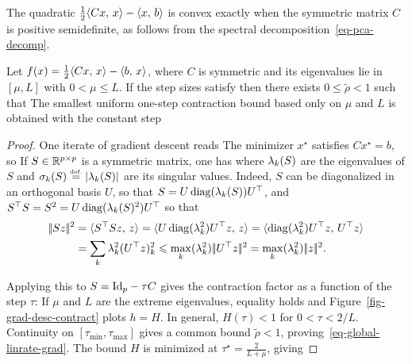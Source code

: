 The quadratic $\frac{1}{2} \langle Cx,\,x\rangle - \langle x,\,b\rangle$ is convex exactly when the symmetric matrix $C$ is positive semidefinite, as follows from the spectral decomposition~\eqref{eq-pca-decomp}.

\begin{prop}\label{prop-graddesc-quad}
	Let $f(x)=\frac12\langle Cx,\,x\rangle-\langle b,\,x\rangle$, where $C$ is symmetric and its eigenvalues lie in $[\mu,L]$ with $0<\mu\leq L$. If the step sizes satisfy
	then there exists $0 \leq \tilde\rho<1$ such that 
	The smallest uniform one-step contraction bound based only on $\mu$ and $L$ is obtained with the constant step
\end{prop}
\begin{proof}
	One iterate of gradient descent reads 
	The minimizer $x^\star$ satisfies $Cx^\star=b$, so
	If $S \in \mathbb{R}^{p \times p}$ is a symmetric matrix, one has 
	where $\lambda_k(S)$ are the eigenvalues of $S$ and $\sigma_k(S) \stackrel{\mbox{\upshape\tiny def.}}{=} |\lambda_k(S)|$ are its singular values.
	Indeed, $S$ can be diagonalized in an orthogonal basis $U$, so that $S=U \operatorname{diag}(\lambda_k(S)) U^\top$,
	and $S^\top S = S^2 = U \operatorname{diag}(\lambda_k(S)^2) U^\top$ so that 
	\begin{align*}
		|\!| Sz |\!|^2 &= \langle S^\top S z,\,z\rangle = \langle U\operatorname{diag}(\lambda_k^2)U^\top z,\,z\rangle
		=\langle \operatorname{diag}(\lambda_k^2) U^\top z,\,U^\top z\rangle \\
		&= \sum_k\lambda_k^2 (U^\top z)_k^2 \leqslant \max_k(\lambda_k^2) |\!| U^\top z |\!|^2
		= \max_k(\lambda_k^2) |\!| z |\!|^2.
	\end{align*}
	
	Applying this to $S = \mathrm{Id}_p-\tau C$ gives the contraction factor as a function of the step $\tau$:
	If $\mu$ and $L$ are the extreme eigenvalues, equality holds and Figure~\ref{fig-grad-desc-contract} plots $h=H$. In general, $H(\tau)<1$ for $0<\tau<2/L$. Continuity on $[\tau_{\min},\tau_{\max}]$ gives a common bound $\tilde\rho<1$, proving~\eqref{eq-global-linrate-grad}.
	The bound $H$ is minimized at $\tau^\star = \frac{2}{L+\mu}$, giving
\end{proof}



